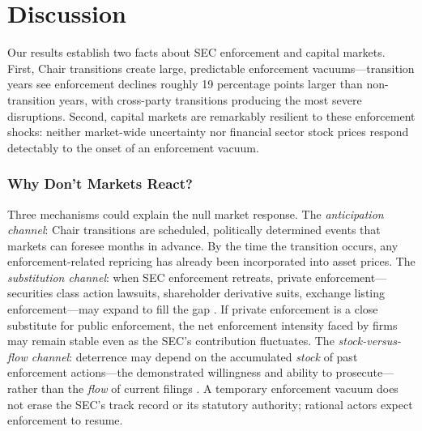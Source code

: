 \documentclass[12pt]{article}
\begin{document}
\section{Discussion}

Our results establish two facts about SEC enforcement and capital markets. First, Chair transitions create large, predictable enforcement vacuums---transition years see enforcement declines roughly 19 percentage points larger than non-transition years, with cross-party transitions producing the most severe disruptions. Second, capital markets are remarkably resilient to these enforcement shocks: neither market-wide uncertainty nor financial sector stock prices respond detectably to the onset of an enforcement vacuum.

\subsubsection*{Why Don't Markets React?} Three mechanisms could explain the null market response. The \emph{anticipation channel}: Chair transitions are scheduled, politically determined events that markets can foresee months in advance. By the time the transition occurs, any enforcement-related repricing has already been incorporated into asset prices. The \emph{substitution channel}: when SEC enforcement retreats, private enforcement---securities class action lawsuits, shareholder derivative suits, exchange listing enforcement---may expand to fill the gap \citep{coffee2007reforming, rose2008multienforcer}. If private enforcement is a close substitute for public enforcement, the net enforcement intensity faced by firms may remain stable even as the SEC's contribution fluctuates. The \emph{stock-versus-flow channel}: deterrence may depend on the accumulated \emph{stock} of past enforcement actions---the demonstrated willingness and ability to prosecute---rather than the \emph{flow} of current filings \citep{kedia2006economics}. A temporary enforcement vacuum does not erase the SEC's track record or its statutory authority; rational actors expect enforcement to resume.
\end{document}
